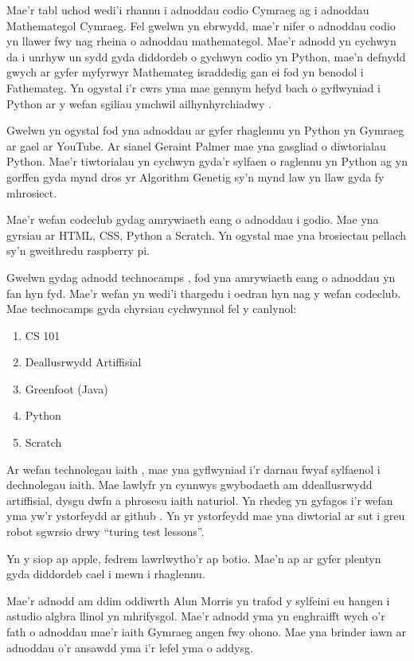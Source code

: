 Mae'r tabl uchod wedi'i rhannu i adnoddau codio Cymraeg ag i adnoddau Mathemategol Cymraeg. Fel gwelwn yn ebrwydd, mae'r nifer o adnoddau codio yn llawer fwy nag rheina o adnoddau mathemategol. Mae'r adnodd \cite{Cyfrifiadureg-maths} yn cychwyn da i unrhyw un sydd gyda diddordeb o gychwyn codio yn Python, mae'n defnydd gwych ar gyfer myfyrwyr Mathemateg israddedig gan ei fod yn benodol i Fathemateg. Yn ogystal i'r cwrs yma mae gennym hefyd bach o gyflwyniad i Python ar y wefan sgiliau ymchwil ailhynhyrchiadwy \cite{python-sgiliauymchwil}. 

Gwelwn yn ogystal fod yna adnoddau ar gyfer rhaglennu yn Python yn Gymraeg ar gael ar YouTube. Ar sianel Geraint Palmer mae yna gasgliad o diwtorialau Python. Mae'r tiwtorialau yn cychwyn gyda'r sylfaen o raglennu yn Python ag yn gorffen gyda mynd dros yr Algorithm Genetig sy'n mynd law yn llaw gyda fy mhrosiect.

Mae'r wefan codeclub gydag amrywiaeth eang o adnoddau i godio. Mae yna gyrsiau ar HTML, CSS, Python a Scratch. Yn ogystal mae yna brosiectau pellach sy'n gweithredu raspberry pi. 

Gwelwn gydag adnodd technocamps \cite{technocamps}, fod yna amrywiaeth eang o adnoddau yn fan hyn fyd. Mae'r wefan yn wedi'i thargedu i oedran hyn nag y wefan codeclub. Mae technocamps gyda chyrsiau cychwynnol fel y canlynol:

\begin{enumerate}
	\item CS 101
	\item Deallusrwydd Artiffisial
	\item Greenfoot (Java)
	\item Python
	\item Scratch
\end{enumerate} 

Ar wefan technolegau iaith \cite{technolegau-iaith}, mae yna gyflwyniad i'r darnau fwyaf sylfaenol i dechnolegau iaith. Mae lawlyfr yn cynnwys gwybodaeth am ddeallusrwydd artiffisial, dysgu dwfn a phrosesu iaith naturiol. Yn rhedeg yn gyfagos i'r wefan yma yw'r ystorfeydd ar github \cite{github-technolegauiaith}. Yn yr ystorfeydd mae yna diwtorial ar sut i greu robot sgwrsio drwy ``turing test lessons''. 

Yn y siop ap apple, fedrem lawrlwytho'r ap botio. Mae'n ap ar gyfer plentyn gyda diddordeb cael i mewn i rhaglennu.

Mae'r adnodd am ddim oddiwrth Alun Morris \cite{Algebra-llinol} yn trafod y sylfeini eu hangen i astudio algbra llinol yn mhrifysgol. Mae'r adnodd yma yn enghraifft wych o'r fath o adnoddau mae'r iaith Gymraeg angen fwy ohono. Mae yna brinder iawn ar adnoddau o'r ansawdd yma i'r lefel yma o addysg. 

